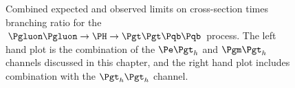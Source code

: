 \begin{figure}
\begin{center}

\end{center}
\caption[Combined expected and observed limits on cross-section times branching ratio for the
$\Pgluon\Pgluon\to\PH\to\Pgt\Pgt\Pqb\Pqb$ process.]{
Combined expected and observed limits on cross-section times branching ratio for the
$\Pgluon\Pgluon\to\PH\to\Pgt\Pgt\Pqb\Pqb$ process. The left hand plot is the
combination of the $\etau$ and $\mutau$ channels discussed in this chapter, and
the right hand plot includes combination with the $\tautau$ channel.}
\label{fig:HhhCmblimits}
\end{figure}


